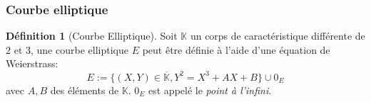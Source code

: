 \documentclass[10pt,a4paper]{beamer}
\theoremstyle{plain}
\theoremstyle{definition}
\theoremstyle{definition}
\theoremstyle{definition}
\theoremstyle{definition}
\newtheorem{defi}[thm]{Définition}
\theoremstyle{remark}
\theoremstyle{remark}
\begin{document}
\begin{frame}
\frametitle{Courbe elliptique }

\begin{defi}[Courbe Elliptique]
Soit $\mathbb{K}$ un corps de caractéristique différente de $2$ et $3$, une courbe elliptique $E$ peut être définie à l'aide d'une équation de Weierstrass: 
\begin{equation*}
\label{eq:weierstrass-proj}
E:=\{ (X,Y) \in \overline{\mathbb{K}} , Y^2=X^3+AX+B \} \cup 0_E
\end{equation*}
avec $A,B$ des éléments de $\mathbb{K}$. $0_E$ est appelé le \emph{point à l'infini}. 
\end{defi}

\begin{figure}
\begin{center}

\end{center}
\end{figure}
\end{frame}
\end{document}
